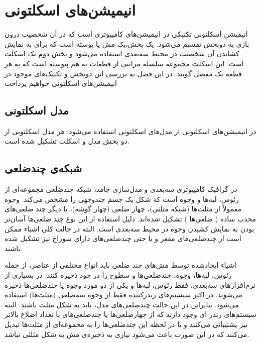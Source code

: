 \chapter { انیمیشن‌های اسکلتونی }


انیمیشن‌ اسکلتونی تکنیکی در انیمیشن‌های کامپیوتری است که در آن شخصیت درون بازی به دوبخش تقسیم ‌می‌شود. یک بخش،یک مش یا پوسته است که برای به نمایش کشاندن ‌آن شخصیت در محیط سه‌بعدی استفاده می‌شود و بخش دوم یک اسکلت است. این اسکلت مجموعه سلسله مراتبی از قطعات به‌ هم پیوسته است که به هر قطعه یک مفصل گویند.
در این فصل به بررسی این دوبخش و تکنیک‌های موجود در انیمیشن‌های اسکلتونی خواهیم پرداخت

\section{مدل اسکلتونی}

در انیمیشن‌های اسکلتونی از مدل‌های اسکلتونی استفاده می‌شود. هر مدل اسکلتونی از دو بخش مدل و اسکلت تشکیل شده است. 

\section{شبکه‌ی\protect{} چندضلعی}

در گرافیک کامپیوتری سه‌بعدی و مدل‌سازی جامد، شبکه چند‌ضلعی مجموعه‌ای از رئوس، لبه‌ها و وجوه است که شکل یک جسم چند‌وجهی را مشخص می‌کند.
وجوه معمولاً از مثلث‌ها (شبکه مثلثی)، چهار ضلعی (چهار گوشه)، یا دیگر چند ضلعی‌های محدب ساده
(
	ضلعی‌ها
)
تشکیل شده‌اند. دلیل استفاده از این نوع چند ضلعی‌ها آسان‌تر بودن به نمایش کشیدن وجوه در محیط سه‌بعدی است.
البته در حالت کلی اشیاء ممکن است از چندضلعی‌های مقعر و یا حتی چندضلعی‌های دارای سوراخ نیز تشکیل شده باشند.

اشیاء ایجادشده توسط مش‌های چند ضلعی باید انواع مختلفی از عناصر، از جمله رئوس، لبه‌ها، وجوه، چندضلعی‌ها و سطوح را در خود ذخیره کنند.
در بسیاری از نرم‌افزارهای سه‌بعدی، فقط رئوس، لبه‌ها و یکی از دو مورد وجوه یا چند‌ضلعی‌ها ذخیره می‌شوند.
در اکثر سیستم‌های رندرکننده
فقط از وجوه سه‌ضلعی
(مثلث‌ها)
استفاده‌ می‌شود.
بنابراین در این حالت چند‌ضلعی‌های مدل، باید به شکل مثلث باشند. البته سیستم‌های رندر ای وجود دارند که از چهارضلعی‌ها یا چندضلعی‌های با تعداد اضلاع بالاتر نیز پشتیبانی ‌می‌کنند و یا در لحظه این چندضلعی‌ها را به مجموعه‌ای از مثلث‌ها تبدیل می‌کنند که در این صورت باعث ‌می‌شود نیازی به ذخیره‌ی مش به شکل مثلثی نباشد.

